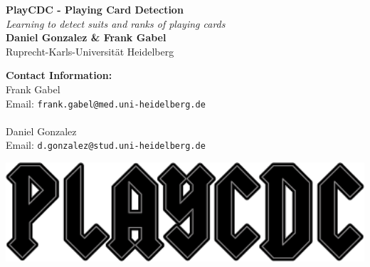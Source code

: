 \documentclass[a0,landscape]{a0poster}
\begin{document}


\begin{minipage}[b]{0.48\linewidth}
\veryHuge \color{NavyBlue} \textbf{PlayCDC - Playing Card Detection} \color{Black}\\ %
\Huge\textit{Learning to detect suits and ranks of playing cards}\\[1cm] %
\huge \textbf{Daniel Gonzalez \& Frank Gabel}\\ %
\huge Ruprecht-Karls-Universit\"at Heidelberg
\\ %
\end{minipage}
%
\begin{minipage}[b]{0.27\linewidth}
\color{DarkSlateGray}\Large \textbf{Contact Information:}\\
Frank Gabel\\ %
Email: \texttt{frank.gabel@med.uni-heidelberg.de}\
\\\\
Daniel Gonzalez \\
Email: \texttt{d.gonzalez@stud.uni-heidelberg.de}\\ %
\end{minipage}
%
\begin{minipage}[b]{0.45\linewidth}

\includegraphics[width=30cm]{playcdc.png} \vspace{3cm}%
\end{minipage}
\end{document}
